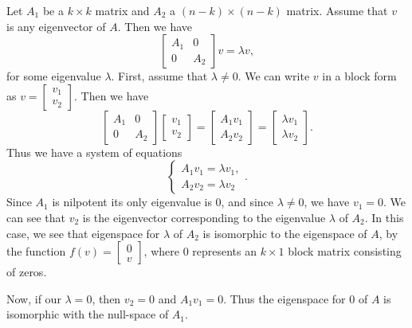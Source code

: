 \documentclass{article}
\begin{document}
\begin{solution}
  Let $A_1$ be a $k \times k$ matrix and $A_2$ a $(n - k) \times (n - k)$ matrix.
  Assume that $v$ is any eigenvector of $A$.
  Then we have
  \[\begin{bmatrix} A_1 & 0\\ 0 & A_2 \end{bmatrix} v = \lambda v,\]
  for some eigenvalue $\lambda$.
  First, assume that $\lambda \neq 0$.
  We can write $v$ in a block form as $v = \begin{bmatrix} v_1\\ v_2 \end{bmatrix}$.
  Then we have
  \[\begin{bmatrix} A_1 & 0\\ 0 & A_2 \end{bmatrix} \begin{bmatrix} v_1\\ v_2 \end{bmatrix} = \begin{bmatrix} A_1 v_1\\ A_2 v_2 \end{bmatrix} =  \begin{bmatrix} \lambda v_1\\ \lambda v_2 \end{bmatrix}.\]
  Thus we have a system of equations
  \[\begin{cases} A_1 v_1 = \lambda v_1,\\ A_2 v_2 = \lambda v_2 \end{cases}.\]
  Since $A_1$ is nilpotent its only eigenvalue is $0$, and since $\lambda \neq 0$, we have $v_1 = 0$.
  We can see that $v_2$ is the eigenvector corresponding to the eigenvalue $\lambda$ of $A_2$.
  In this case, we see that eigenspace for $\lambda$ of $A_2$ is isomorphic to the eigenspace of $A$, by the function $f(v) = \begin{bmatrix} 0\\ v \end{bmatrix}$, where $0$ represents an $k \times 1$ block matrix consisting of zeros.
  
  Now, if our $\lambda = 0$, then $v_2 = 0$ and $A_1 v_1 = 0$.
  Thus the eigenspace for $0$ of $A$ is isomorphic with the null-space of $A_1$.
\end{solution}
\end{document}

